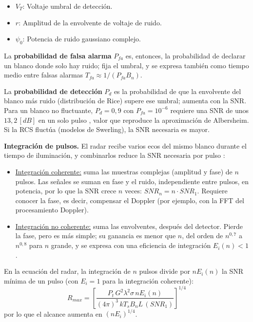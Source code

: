 \begin{itemize}
    \item $V_T$: Voltaje umbral de detección.
    \item $r$: Amplitud de la envolvente de voltaje de ruido.
    \item $\psi_0$: Potencia de ruido gaussiano complejo.
\end{itemize}

La \textbf{probabilidad de falsa alarma} $P_{fa}$ es, entonces, la probabilidad de declarar un blanco donde solo hay ruido; fija el umbral, y se expresa también como tiempo medio entre falsas alarmas $T_{fa} \approx 1/(P_{fa} B_n)$.

La \textbf{probabilidad de detección} $P_d$ es la probabilidad de que la envolvente del blanco más ruido (distribución de Rice) supere ese umbral; aumenta con la SNR. Para un blanco no fluctuante, $P_d = 0{,}9$ con $P_{fa} = 10^{-6}$ requiere una SNR de unos $13{,}2 \, [dB]$ en un solo pulso \cite{apunte}, valor que reproduce la aproximación de Albersheim. Si la RCS fluctúa (modelos de Swerling), la SNR necesaria es mayor.

\textbf{Integración de pulsos.} El radar recibe varios ecos del mismo blanco durante el tiempo de iluminación, y combinarlos reduce la SNR necesaria por pulso \cite{apunte, richards}:
\begin{itemize}
    \item \underline{Integración coherente:} suma las muestras complejas (amplitud y fase) de $n$ pulsos. Las señales se suman en fase y el ruido, independiente entre pulsos, en potencia, por lo que la SNR crece $n$ veces: $SNR_n = n \cdot SNR_1$. Requiere conocer la fase, es decir, compensar el Doppler (por ejemplo, con la FFT del procesamiento Doppler).
    \item \underline{Integración no coherente:} suma las envolventes, después del detector. Pierde la fase, pero es más simple; su ganancia es menor que $n$, del orden de $n^{0{,}7}$ a $n^{0{,}8}$ para $n$ grande, y se expresa con una eficiencia de integración $E_i(n) < 1$.
\end{itemize}
En la ecuación del radar, la integración de $n$ pulsos divide por $n E_i(n)$ la SNR mínima de un pulso (con $E_i = 1$ para la integración coherente):
\begin{equation}
    R_{max} = \left[ \frac{P_t \, G^2 \lambda^2 \sigma \, n E_i(n)}{(4\pi)^3 \, k T_s B_n L \, (SNR_1)} \right]^{1/4}
\end{equation}
por lo que el alcance aumenta en $(n E_i)^{1/4}$.

